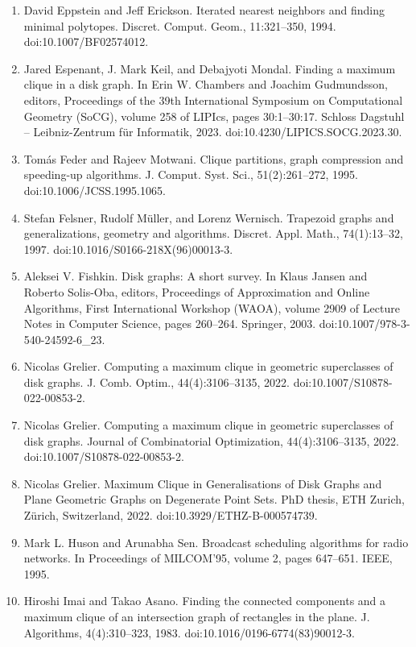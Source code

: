 \documentclass[10pt,a4paper]{amsart}
\begin{document}
\begin{enumerate}
\item[]  [20]  David Eppstein and Jeff Erickson.  Iterated nearest neighbors and finding minimal polytopes.  Discret. Comput. Geom., 11:321–350, 1994.  doi:10.1007/BF02574012.  
\item[]  [21]  Jared Espenant, J. Mark Keil, and Debajyoti Mondal.  Finding a maximum clique in a disk graph.  In Erin W. Chambers and Joachim Gudmundsson, editors, Proceedings of the 39th International Symposium on Computational Geometry (SoCG), volume 258 of LIPIcs, pages 30:1–30:17. Schloss Dagstuhl – Leibniz-Zentrum für Informatik, 2023.  doi:10.4230/LIPICS.SOCG.2023.30.  
\item[]  [22]  Tomás Feder and Rajeev Motwani.  Clique partitions, graph compression and speeding-up algorithms.  J. Comput. Syst. Sci., 51(2):261–272, 1995.  doi:10.1006/JCSS.1995.1065.  
\item[]  [23]  Stefan Felsner, Rudolf Müller, and Lorenz Wernisch.  Trapezoid graphs and generalizations, geometry and algorithms.  Discret. Appl. Math., 74(1):13–32, 1997.  doi:10.1016/S0166-218X(96)00013-3.  
\item[]  [24]  Aleksei V. Fishkin.  Disk graphs: A short survey.  In Klaus Jansen and Roberto Solis-Oba, editors, Proceedings of Approximation and Online Algorithms, First International Workshop (WAOA), volume 2909 of Lecture Notes in Computer Science, pages 260–264. Springer, 2003.  doi:10.1007/978-3-540-24592-6\_23.  
\item[]  [25]  Nicolas Grelier.  Computing a maximum clique in geometric superclasses of disk graphs.  J. Comb. Optim., 44(4):3106–3135, 2022.  doi:10.1007/S10878-022-00853-2.  
\item[]  [26]  Nicolas Grelier.  Computing a maximum clique in geometric superclasses of disk graphs.  Journal of Combinatorial Optimization, 44(4):3106–3135, 2022.  doi:10.1007/S10878-022-00853-2.  
\item[]  [27]  Nicolas Grelier.  Maximum Clique in Generalisations of Disk Graphs and Plane Geometric Graphs on Degenerate Point Sets.  PhD thesis, ETH Zurich, Zürich, Switzerland, 2022.  doi:10.3929/ETHZ-B-000574739.  
\item[]  [28]  Mark L. Huson and Arunabha Sen.  Broadcast scheduling algorithms for radio networks.  In Proceedings of MILCOM’95, volume 2, pages 647–651. IEEE, 1995.  
\item[]  [29]  Hiroshi Imai and Takao Asano.  Finding the connected components and a maximum clique of an intersection graph of rectangles in the plane.  J. Algorithms, 4(4):310–323, 1983.  doi:10.1016/0196-6774(83)90012-3.  

\end{enumerate}
\end{document}
